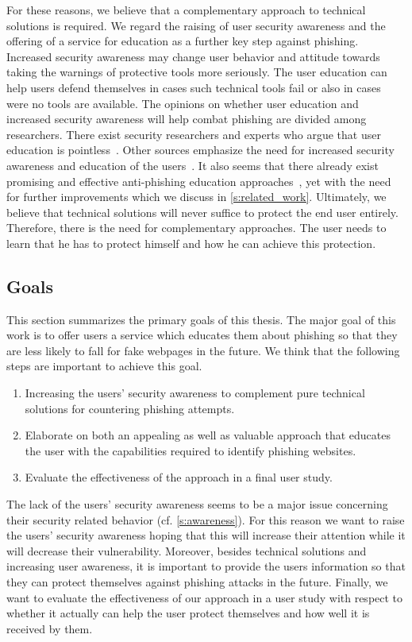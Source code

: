 For these reasons, we believe that a complementary approach to technical solutions is required.
We regard the raising of user security awareness and the offering of a service for education as a further key step against phishing.
Increased security awareness may change user behavior and attitude towards taking the warnings of protective tools more seriously.
The user education can help users defend themselves in cases such technical tools fail or also in cases were no tools are available.
The opinions on whether user education and increased security awareness will help combat phishing are divided among researchers.
There exist security researchers and experts who argue that user education is pointless~\cite{useredupointless, bruceschneieronsecuritytraining}.
Other sources emphasize the need for increased security awareness and education of the users~\cite{usereducebit, usereduscmagazine}.
It also seems that there already exist promising and effective anti-phishing education approaches~\cite{kumaraguru2007protecting, sheng2007antiphishingphil}, yet with the need for further improvements which we discuss in \autoref{s:related_work}.
Ultimately, we believe that technical solutions will never suffice to protect the end user entirely.
Therefore, there is the need for complementary approaches.
The user needs to learn that he has to protect himself and how he can achieve this protection.
 
\subsection{Goals}
\label{s:goals}
This section summarizes the primary goals of this thesis.
The major goal of this work is to offer users a service which educates them about phishing so that they are less likely to fall for fake webpages in the future.
 We think that the following steps are important to achieve this goal.

\begin{enumerate}
	\item Increasing the users' security awareness to complement pure technical solutions for countering phishing attempts.
	\item Elaborate on both an appealing as well as valuable approach that educates the user with the capabilities required to identify phishing websites.
	\item Evaluate the effectiveness of the approach in a final user study.
\end{enumerate}
The lack of the users' security awareness seems to be a major issue concerning their security related behavior (cf. \autoref{s:awareness}).
 For this reason we want to raise the users' security awareness hoping that this will increase their attention while it will decrease their vulnerability.
 Moreover, besides technical solutions and increasing user awareness, it is important to provide the users information so that they can protect themselves against phishing attacks in the future.
Finally, we want to evaluate the effectiveness of our approach in a user study with respect to whether it actually can help the user protect themselves and how well it is received by them.

